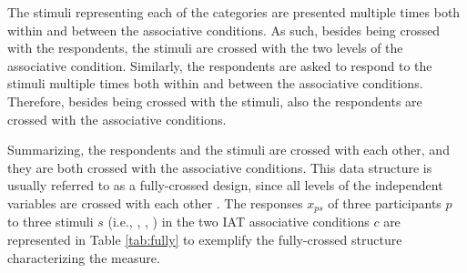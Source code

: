 \documentclass[12pt]{book}
\begin{document}

The stimuli representing each of the categories are presented multiple times both within and between the associative conditions. As such, besides being crossed with the respondents, the stimuli are crossed with the two levels of the associative condition. 
Similarly, the respondents are asked to respond to the stimuli multiple times both within and between the associative conditions. Therefore, besides being crossed with the stimuli, also the respondents are crossed with the associative conditions.  

Summarizing, the respondents and the stimuli are crossed with each other, and they are both crossed with the associative conditions. 
This data structure is usually referred to as a fully-crossed design, since all levels of the independent variables are crossed with each other \cite{Westfall2014}. 
The responses $x_{ps}$ of three participants $p$ to three stimuli $s$ (i.e., \Cat, \Snowman[1.5], \NiceReapey) in the two IAT associative conditions $c$ are represented in Table \ref{tab:fully} to exemplify the fully-crossed structure characterizing the measure.  


\end{document}
